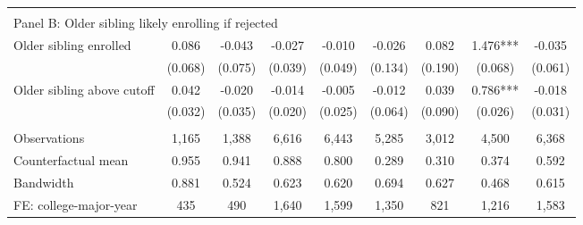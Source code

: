 {{\begin{tabular}{lcccccccc}
&  &  &  & & & & & &    \\
\multicolumn{9}{l}{Panel B: Older sibling likely enrolling if rejected} \\
Older sibling enrolled&       0.086   &      -0.043   &      -0.027   &      -0.010   &      -0.026   &       0.082   &       1.476***&      -0.035   \\
                    &     (0.068)   &     (0.075)   &     (0.039)   &     (0.049)   &     (0.134)   &     (0.190)   &     (0.068)   &     (0.061)   \\
 
Older sibling above cutoff&       0.042   &      -0.020   &      -0.014   &      -0.005   &      -0.012   &       0.039   &       0.786***&      -0.018   \\
                    &     (0.032)   &     (0.035)   &     (0.020)   &     (0.025)   &     (0.064)   &     (0.090)   &     (0.026)   &     (0.031)   \\
                    &               &               &               &               &               &               &               &               \\
Observations        &       1,165   &       1,388   &       6,616   &       6,443   &       5,285   &       3,012   &       4,500   &       6,368   \\
Counterfactual mean &       0.955   &       0.941   &       0.888   &       0.800   &       0.289   &       0.310   &       0.374   &       0.592   \\
Bandwidth           &       0.881   &       0.524   &       0.623   &       0.620   &       0.694   &       0.627   &       0.468   &       0.615   \\
FE: college-major-year&         435   &         490   &       1,640   &       1,599   &       1,350   &         821   &       1,216   &       1,583   \\
 

\bottomrule
\end{tabular}
}
}
